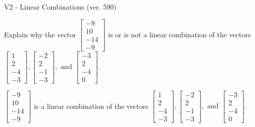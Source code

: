\begin{exercise}
  \begin{exerciseTitle}V2 - Linear Combinations (ver. 590)\end{exerciseTitle}
  \begin{exerciseStatement}
    Explain why the vector \(\left[\begin{array}{c}
-9 \\
10 \\
-14 \\
-9
\end{array}\right]\)  is or is not a linear 
	combination of the vectors \(\left[\begin{array}{c}
1 \\
2 \\
-4 \\
-3
\end{array}\right] , \left[\begin{array}{c}
-2 \\
2 \\
-1 \\
-3
\end{array}\right] , \text{ and } \left[\begin{array}{c}
-3 \\
2 \\
-4 \\
0
\end{array}\right]\).
	


  \end{exerciseStatement}
  \begin{exerciseAnswer}
   \(\left[\begin{array}{c}
-9 \\
10 \\
-14 \\
-9
\end{array}\right]\) 
  	 is  
	a linear combination of the vectors \(\left[\begin{array}{c}
1 \\
2 \\
-4 \\
-3
\end{array}\right] , \left[\begin{array}{c}
-2 \\
2 \\
-1 \\
-3
\end{array}\right] , \text{ and } \left[\begin{array}{c}
-3 \\
2 \\
-4 \\
0
\end{array}\right]\).

	
  


  \end{exerciseAnswer}
\end{exercise}